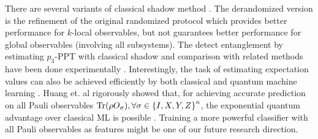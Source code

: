 \documentclass[
aps,
pra,
twocolumn,
floatfix,
]{revtex4-2}
\theoremstyle{plain}
\theoremstyle{definition}
\newcommand{\ob}{O}
\newcommand{\pob}{O}
\newcommand{\dm}{\rho}
\begin{document}

There are several variants of classical shadow method \cite{huangEfficientEstimationPauli2021} \cite{chenRobustShadowEstimation2021}.
The derandomized version is the refinement of the original randomized protocol which provides better performance for $k$-local observables, 
but not guarantees better performance for global observables (involving all subsystems).  
The detect entanglement by estimating $p_3$-PPT with classical shadow and comparison with related methods have been done experimentally \cite{elbenMixedstateEntanglementLocal2020} \cite{zhangExperimentalQuantumState2021}.
Interestingly, the task of estimating expectation values can also be achieved efficiently by both classical \cite{gaoEfficientRepresentationQuantum2017} \cite{torlaiManybodyQuantumState2018} \cite{zhuFlexibleLearningQuantum2022} and quantum machine learning \cite{huangPowerDataQuantum2021} \cite{huangProvablyEfficientMachine2022}.
Huang et. al rigorously showed that, 
for achieving accurate prediction on all Pauli observables $\Tr(\dm\pob_{\sigma} ), \forall \sigma \in \qty{ I, X, Y, Z }^n$, the exponential quantum advantage over classical ML is possible
\cite{huangInformationtheoreticBoundsQuantum2021}.
Training a more powerful classifier with all Pauli observables as features might be one of our future research direction.
\end{document}
